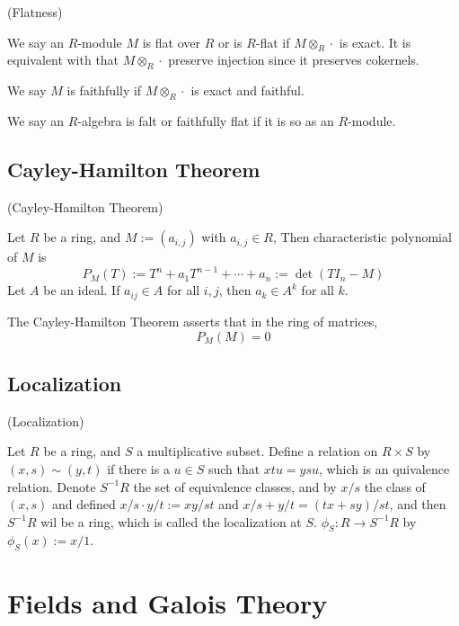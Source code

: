 \documentclass{article}
\begin{document}
\begin{definition}
    (Flatness)\par
    We say an $R$-module $M$ is flat over $R$ or is $R$-flat if $M\otimes_R \cdot$ is exact. It is equivalent with that $M\otimes_R \cdot$ preserve injection since it preserves cokernels.\par
    We say  $M$ is faithfully if $M\otimes_R \cdot$ is exact and faithful.\par
    We say an $R$-algebra is falt or faithfully flat if it is so as an $R$-module.
\end{definition}

\subsection{Cayley-Hamilton Theorem}

\begin{theorem}
    (Cayley-Hamilton Theorem)\par
    Let $R$ be a ring, and $M:= (a_{i,j})$ with $a_{i,j} \in R$, Then characteristic polynomial of $M$ is
    \[P_M(T) := T^n + a_1T^{n-1}+\cdots + a_n := \det(TI_n - M)\]
    Let $A$ be an ideal. If $a_{ij} \in A$ for all $i,j$, then $a_k \in A^k$ for all $k$.\par
    The Cayley-Hamilton Theorem asserts that in the ring of matrices,
    \[P_M(M) = 0\]
\end{theorem}

\subsection{Localization}

\begin{definition}
    (Localization)\par
    Let $R$ be a ring, and $S$ a multiplicative subset. Define a relation on $R\times S$ by $(x,s) \sim (y,t)$ if there is a $u\in S$ such that $xtu = ysu$, which is an quivalence relation. Denote $S^{-1}R$ the set of equivalence classes, and by $x/s$ the class of $(x,s)$ and defined $x/s \cdot y/t:= xy/st$ and $x/s+y/t = (tx+sy)/st$, and then $S^{-1}R$ wil be a ring, which is called the localization at $S$. $\phi_S:R\to S^{-1}R$ by $\phi_S(x):= x/1$.
\end{definition}

\section{Fields and Galois Theory}
\end{document}
